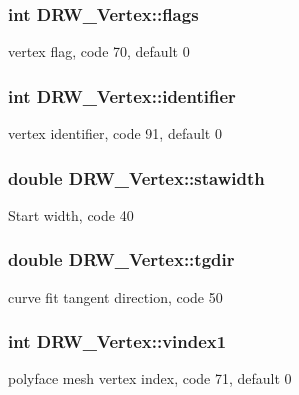 \subsubsection[{flags}]{\setlength{\rightskip}{0pt plus 5cm}int D\+R\+W\+\_\+\+Vertex\+::flags}\label{class_d_r_w___vertex_a662134a0aaac672cbb37c741e872ce3a}
vertex flag, code 70, default 0 \hypertarget{class_d_r_w___vertex_a14a4b517273a6c76a5b905eb691d5193}{}
\subsubsection[{identifier}]{\setlength{\rightskip}{0pt plus 5cm}int D\+R\+W\+\_\+\+Vertex\+::identifier}\label{class_d_r_w___vertex_a14a4b517273a6c76a5b905eb691d5193}
vertex identifier, code 91, default 0 \hypertarget{class_d_r_w___vertex_a59c2c6a18ec24afdec344b187cb89e02}{}
\subsubsection[{stawidth}]{\setlength{\rightskip}{0pt plus 5cm}double D\+R\+W\+\_\+\+Vertex\+::stawidth}\label{class_d_r_w___vertex_a59c2c6a18ec24afdec344b187cb89e02}
Start width, code 40 \hypertarget{class_d_r_w___vertex_ab94318addec1b5ca507a11cf8dd04b34}{}
\subsubsection[{tgdir}]{\setlength{\rightskip}{0pt plus 5cm}double D\+R\+W\+\_\+\+Vertex\+::tgdir}\label{class_d_r_w___vertex_ab94318addec1b5ca507a11cf8dd04b34}
curve fit tangent direction, code 50 \hypertarget{class_d_r_w___vertex_aff58612a8e14eb93c6c7667fa19f087b}{}
\subsubsection[{vindex1}]{\setlength{\rightskip}{0pt plus 5cm}int D\+R\+W\+\_\+\+Vertex\+::vindex1}\label{class_d_r_w___vertex_aff58612a8e14eb93c6c7667fa19f087b}
polyface mesh vertex index, code 71, default 0 \hypertarget{class_d_r_w___vertex_a48f459a7d3627c898fa9e1be5b0de6d6}{}
